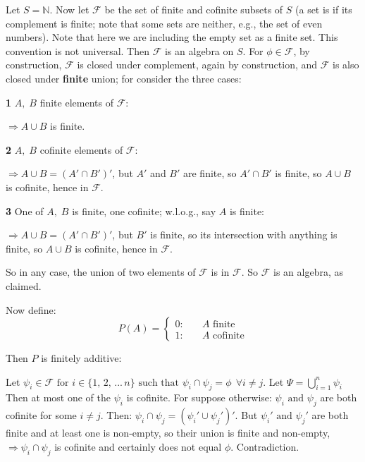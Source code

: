 \documentclass[12pt,a4paper]{article}
\newcommand{\uline}[1]{\underline{\smash{#1}}}
\begin{document}
Let $S = \mathbb{N}$. Now let $\mathcal{F}$ be the set of finite and cofinite subsets of $S$ (a set is \uline{cofinite} if its complement is finite; note that some sets are neither, e.g., the set of even numbers). Note that here we are including the empty set as a finite set. This convention is not universal. Then $\mathcal{F}$ is an algebra on $S$. For $\phi\in\mathcal{F}$, by construction, $\mathcal{F}$ is closed under complement, again by construction, and $\mathcal{F}$ is also closed under \textbf{finite} union; for consider the three cases:\par
\vspace{10pt}
\textbf{1 }  $A,\;B$ finite elements of $\mathcal{F}$:\par
\vspace{10pt}
\indent $\Rightarrow A\cup B$ is finite.\par
\vspace{10pt}
\textbf{2 }  $A,\;B$ cofinite elements of $\mathcal{F}$:\par
\vspace{10pt}
\indent $\Rightarrow A\cup B = (A'\cap B')'$, but $A'$ and $B'$ are finite, so $A'\cap B'$ is finite, so $A\cup B$ is cofinite, hence in $\mathcal{F}.$\par
\vspace{10pt}
\textbf{3 }  One of $A,\;B$ is finite, one cofinite; w.l.o.g., say $A$ is finite:\par
\vspace{10pt}
\indent $\Rightarrow A\cup B = (A'\cap B')'$, but $B'$ is finite, so its intersection with anything is finite, so $A\cup B$ is cofinite, hence in $\mathcal{F}.$

So in any case, the union of two elements of $\mathcal{F}$ is in $\mathcal{F}$. So $\mathcal{F}$ is an algebra, as claimed.\par

Now define:
$$P(A) = \left\{\begin{array}{ll} 0:\quad & A \text{ finite}\\ 1:\quad & A \text{ cofinite}\end{array}\right.$$

Then $P$ is finitely additive:\par
Let $\psi_i\in\mathcal{F} \text{ for } i \in \{1,\,2,\,...\,n\} \text{ such that } \psi_i \cap \psi_j = \phi \:\:\forall i\neq j$.
Let $\Psi = \bigcup\limits_{i=1}^{n}\psi_i$\\
\indent Then at most one of the $\psi_i$ is cofinite. For suppose otherwise: $\psi_i \text{ and } \psi_j$ are both cofinite for some $i\neq j$. Then: $\psi_i \cap \psi_j = (\psi_i' \cup \psi_j')'$. But $\psi_i' \text{ and } \psi_j'$ are both finite and at least one is non-empty, so their union is finite and non-empty, $\Rightarrow \psi_i \cap \psi_j$ is cofinite and certainly does not equal $\phi$. Contradiction.\par
\end{document}
